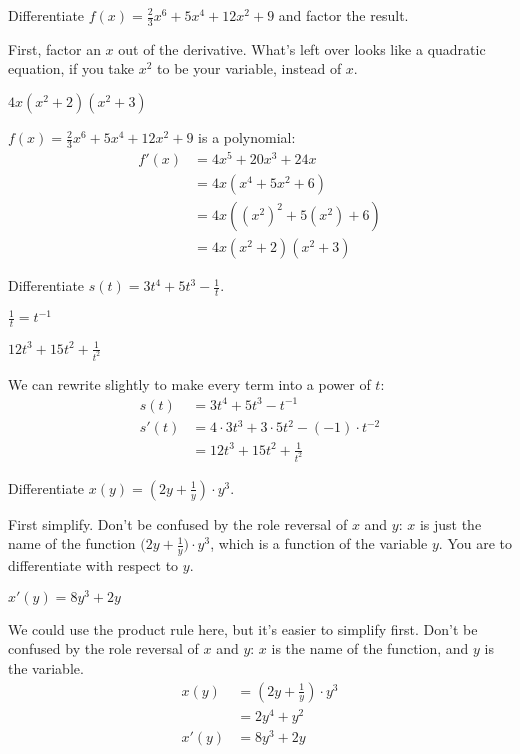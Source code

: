 \begin{question} Differentiate
$f(x)=\frac{2}{3}x^6+5x^4+12x^2+9$ and factor the result.
\end{question}
\begin{hint} First, factor an $x$ out of the derivative. What's left over looks like a quadratic equation, if you take $x^2$ to be your variable, instead of $x$.
\end{hint}
\begin{answer} $4x(x^2+2)(x^2+3)$
\end{answer}
\begin{solution}
$f(x)=\frac{2}{3}x^6+5x^4+12x^2+9$ is a polynomial:
\begin{align*}
f'(x)&=4x^5+20x^3+24x\\&
=4x(x^4+5x^2+6)\\& = 4x((x^2)^2+5(x^2)+6)\\&=4x(x^2+2)(x^2+3)
\end{align*}
\end{solution}


\begin{question} Differentiate $s(t)=3t^4+5t^3-\frac{1}{t}$.
\end{question}
\begin{hint}
$\frac{1}{t}=t^{-1}$
\end{hint}
\begin{answer} $12t^3+15t^2+\frac{1}{t^2}$
\end{answer}
\begin{solution}  We can rewrite slightly to make every term into a power of $t$:
\begin{align*}
s(t)&=3t^4+5t^3-t^{-1}\\
s'(t)&=4\cdot 3t^{3}+3\cdot 5t^2-(-1)\cdot t^{-2}\\
&=12t^3+15t^2+\frac{1}{t^2}
\end{align*}
\end{solution}



\begin{Mquestion} Differentiate $x(y) = \left(2y+\frac{1}{y}\right)\cdot y^3$.
\end{Mquestion}
\begin{hint} First simplify. Don't be confused by the role reversal of $x$ and $y$: $x$ is just
        the name of the function $\big(2y+\tfrac{1}{y}\big)\cdot y^3$, which
        is a function of the variable $y$. You are to differentiate with
        respect to $y$.
\end{hint}
\begin{answer} $x'(y)=8y^3+2y$
\end{answer}
\begin{solution} We could use the product rule here, but it's easier to simplify first. Don't be confused by the role reversal of $x$ and $y$: $x$ is the name of the function, and $y$ is the variable.
\begin{align*}
x(y) &= \left(2y+\frac{1}{y}\right)\cdot y^3\\
&=2y^4+y^2\\
x'(y)&=8y^3+2y
\end{align*}
\end{solution}


